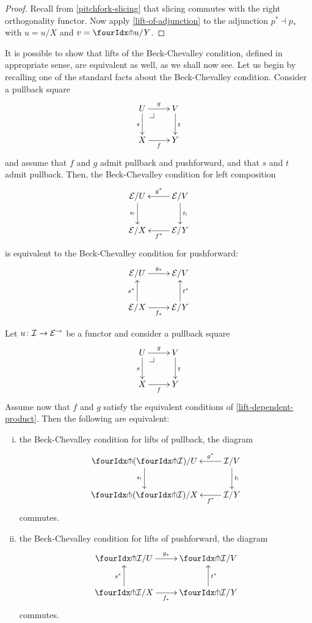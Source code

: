 \documentclass[reqno,10pt,a4paper,oneside]{amsart}
\begin{document}
\begin{proof}
Recall from \cref{pitchfork-slicing} that slicing commutes with the right orthogonality functor.
Now apply \cref{lift-of-adjunction} to the adjunction $p^* \dashv p_*$ with $u = u/X$ and $v = \liftr{u}/Y$.
\end{proof}

It is possible to show that lifts of the Beck-Chevalley condition, defined in appropriate sense, are equivalent as well, as we shall now see. Let us begin by recalling one of the standard facts about the Beck-Chevalley condition. Consider a
pullback square 
\[
\xymatrix{
  U
  \ar[d]_{s}
  \ar[r]^{g}
  \pullback{dr}
&
  V
  \ar[d]^{t}
\\
  X
  \ar[r]_{f}
&
  Y
}
\]
and assume that $f$ and $g$ admit pullback and pushforward, and that $s$ and $t$ admit pullback. Then,
 the Beck-Chevalley condition for left composition
\[
\xymatrix{
  \catE/U
  \ar[d]_{s_!}
&
  \catE/V
  \ar[l]_{g^*}
  \ar[d]^{t_!}
\\
  \catE/X
&
  \catE/Y
  \ar[l]^{f^*}
}
\]
is equivalent to the Beck-Chevalley condition for pushforward:
\[
\xymatrix{
  \catE/U
  \ar[r]^{g_*}
&
  \catE/V
\\
  \catE/X
  \ar[r]_{f_*}
  \ar[u]^{s^*}
&
  \catE/Y
  \ar[u]_{t^*}
}
\]





\begin{proposition}
\label{lift-pushforward-BC} Let $u \colon \mathcal{I} \to \mathcal{E}^{\to}$ be a functor and consider a 
pullback square
\[
\xymatrix{
  U
  \ar[d]_{s}
  \ar[r]^{g}
  \pullback{dr}
&
  V
  \ar[d]^{t}
\\
  X
  \ar[r]_{f}
&
  Y
}
\]
Assume now that $f$ and $g$ satisfy the equivalent conditions of \cref{lift-dependent-product}.
Then the following are equivalent:
\begin{enumerate}[(i)]
\item the Beck-Chevalley condition for lifts of pullback, \ie the diagram
\[
\xymatrix{
  \liftl{(\liftr{\cal{I}})}/U
  \ar[d]_{s_!}
&
  \cal{I}/V
  \ar[l]_-{g^*}
  \ar[d]^{t_!}
\\
  \liftl{(\liftr{\cal{I}})}/X
&
  \cal{I}/Y
  \ar[l]^-{f^*}
}
\]
commutes. 
\item the Beck-Chevalley  condition for lifts of pushforward, \ie the diagram
\[
\xymatrix{
  \liftr{\cal{I}}/U
  \ar[r]^{g_*}
&
  \liftr{\cal{I}}/V
\\
  \liftr{\cal{I}}/X
  \ar[r]_{f_*}
  \ar[u]^{s^*}
&
  \liftr{\cal{I}}/Y
  \ar[u]_{t^*}
}
\]
commutes.
\end{enumerate}
\end{proposition}
\end{document}
